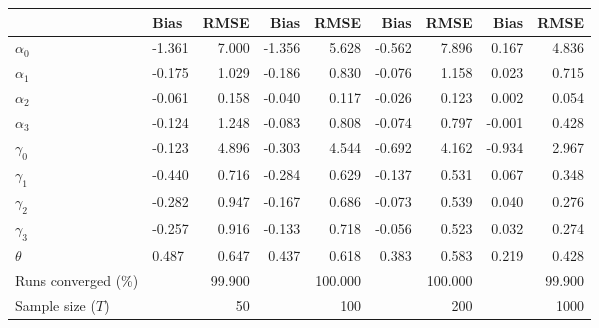 
\begin{tabular}[t]{llrrrrrrr}
\toprule
  & Bias & RMSE & Bias & RMSE & Bias & RMSE & Bias & RMSE\\
\midrule
$\alpha_{0}$ & -1.361 & 7.000 & -1.356 & 5.628 & -0.562 & 7.896 & 0.167 & 4.836\\
$\alpha_{1}$ & -0.175 & 1.029 & -0.186 & 0.830 & -0.076 & 1.158 & 0.023 & 0.715\\
$\alpha_{2}$ & -0.061 & 0.158 & -0.040 & 0.117 & -0.026 & 0.123 & 0.002 & 0.054\\
$\alpha_{3}$ & -0.124 & 1.248 & -0.083 & 0.808 & -0.074 & 0.797 & -0.001 & 0.428\\
$\gamma_{0}$ & -0.123 & 4.896 & -0.303 & 4.544 & -0.692 & 4.162 & -0.934 & 2.967\\
$\gamma_{1}$ & -0.440 & 0.716 & -0.284 & 0.629 & -0.137 & 0.531 & 0.067 & 0.348\\
$\gamma_{2}$ & -0.282 & 0.947 & -0.167 & 0.686 & -0.073 & 0.539 & 0.040 & 0.276\\
$\gamma_{3}$ & -0.257 & 0.916 & -0.133 & 0.718 & -0.056 & 0.523 & 0.032 & 0.274\\
$\theta$ & 0.487 & 0.647 & 0.437 & 0.618 & 0.383 & 0.583 & 0.219 & 0.428\\
Runs converged (\%) &  & 99.900 &  & 100.000 &  & 100.000 &  & 99.900\\
Sample size ($T$) &  & 50 &  & 100 &  & 200 &  & 1000\\
\bottomrule
\end{tabular}
